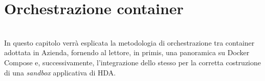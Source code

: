 
\chapter{Orchestrazione container}
\label{cap:orchestrazione-container}

\\
In questo capitolo verrà esplicata la metodologia di orchestrazione tra container adottata in Azienda, fornendo al lettore, in primis, una panoramica su Docker Compose e, successivamente, l'integrazione dello stesso per la corretta costruzione di una \textit{sandbox} applicativa di HDA.
